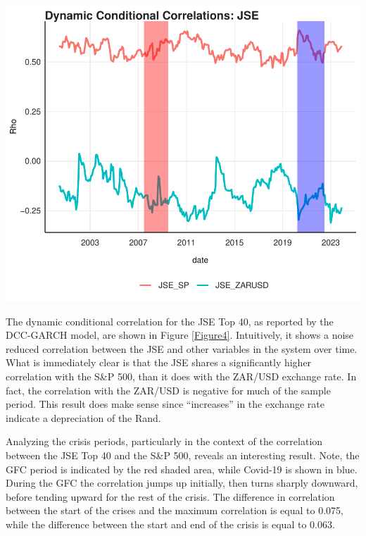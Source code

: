 \documentclass[11pt,preprint, authoryear]{elsarticle}
\let\origfigure\figure
\let\endorigfigure\endfigure
\renewenvironment{figure}[1][2] {
    \expandafter\origfigure\expandafter[H]
} {
    \endorigfigure
}
\numberwithin{equation}{section}
\numberwithin{figure}{section}
\numberwithin{table}{section}
\begin{document}
\begin{figure}[H]

{\centering \includegraphics{Template_files/figure-latex/Figure4-1} 

}

\caption{DCC GARCH \label{Figure4}}\label{fig:Figure4}
\end{figure}

The dynamic conditional correlation for the JSE Top 40, as reported by
the DCC-GARCH model, are shown in Figure \ref{Figure4}. Intuitively, it
shows a noise reduced correlation between the JSE and other variables in
the system over time. What is immediately clear is that the JSE shares a
significantly higher correlation with the S\&P 500, than it does with
the ZAR/USD exchange rate. In fact, the correlation with the ZAR/USD is
negative for much of the sample period. This result does make sense
since ``increases'' in the exchange rate indicate a depreciation of the
Rand.

Analyzing the crisis periods, particularly in the context of the
correlation between the JSE Top 40 and the S\&P 500, reveals an
interesting result. Note, the GFC period is indicated by the red shaded
area, while Covid-19 is shown in blue. During the GFC the correlation
jumps up initially, then turns sharply downward, before tending upward
for the rest of the crisis. The difference in correlation between the
start of the crises and the maximum correlation is equal to 0.075, while
the difference between the start and end of the crisis is equal to
0.063.
\end{document}
